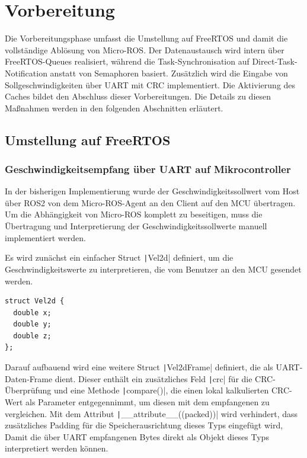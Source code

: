 \section{Vorbereitung}

Die Vorbereitungsphase umfasst die Umstellung auf FreeRTOS und damit die
vollständige Ablösung von Micro-ROS. Der Datenaustausch wird intern über
FreeRTOS-Queues realisiert, während die Task-Synchronisation auf
Direct-Task-Notification anstatt von Semaphoren basiert. Zusätzlich wird die
Eingabe von Sollgeschwindigkeiten über UART mit CRC implementiert. Die
Aktivierung des Caches bildet den Abschluss dieser Vorbereitungen. Die Details
zu diesen Maßnahmen werden in den folgenden Abschnitten erläutert.

\subsection{Umstellung auf FreeRTOS}

\subsubsection{Geschwindigkeitsempfang über UART auf Mikrocontroller}

In der bisherigen Implementierung wurde der Geschwindigkeitssollwert vom Host
über ROS2 von dem Micro-ROS-Agent an den Client auf den MCU übertragen. Um die
Abhängigkeit von Micro-ROS komplett zu beseitigen, muss die Übertragung und
Interpretierung der Geschwindigkeitssollwerte manuell implementiert werden.

Es wird zunächst ein einfacher Struct \texttt|Vel2d| definiert, um die
Geschwindigkeitswerte zu interpretieren, die vom Benutzer an den MCU gesendet
werden.

\begin{code}
\begin{verbatim}
struct Vel2d {
  double x;
  double y;
  double z;
};
\end{verbatim}
\end{code}

Darauf aufbauend wird eine weitere Struct \texttt|Vel2dFrame|
definiert, die als UART-Daten-Frame dient. Dieser enthält ein zusätzliches Feld
\texttt|crc| für die CRC-Überprüfung und eine Methode
\texttt|compare()|, die einen lokal kalkulierten CRC-Wert als Parameter
entgegennimmt, um diesen mit dem empfangenen zu vergleichen. Mit dem Attribut
\linebreak\texttt|__attribute__((packed))| wird verhindert, dass
zusätzliches Padding für die Speicherausrichtung dieses Typs eingefügt wird,
Damit die über UART empfangenen Bytes direkt als Objekt dieses Typs
interpretiert werden können.

